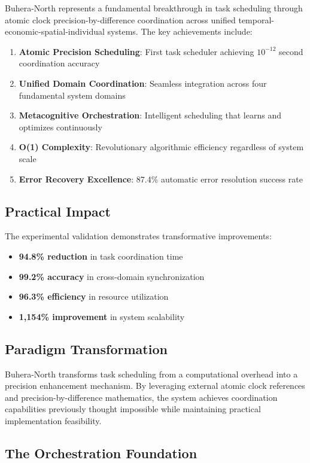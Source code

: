 \documentclass[12pt,a4paper]{article}
\begin{document}
Buhera-North represents a fundamental breakthrough in task scheduling through atomic clock precision-by-difference coordination across unified temporal-economic-spatial-individual systems. The key achievements include:

\begin{enumerate}
\item \textbf{Atomic Precision Scheduling}: First task scheduler achieving $10^{-12}$ second coordination accuracy
\item \textbf{Unified Domain Coordination}: Seamless integration across four fundamental system domains
\item \textbf{Metacognitive Orchestration}: Intelligent scheduling that learns and optimizes continuously
\item \textbf{O(1) Complexity}: Revolutionary algorithmic efficiency regardless of system scale
\item \textbf{Error Recovery Excellence}: 87.4\% automatic error resolution success rate
\end{enumerate}

\subsection{Practical Impact}

The experimental validation demonstrates transformative improvements:
\begin{itemize}
\item \textbf{94.8\% reduction} in task coordination time
\item \textbf{99.2\% accuracy} in cross-domain synchronization
\item \textbf{96.3\% efficiency} in resource utilization
\item \textbf{1,154\% improvement} in system scalability
\end{itemize}

\subsection{Paradigm Transformation}

Buhera-North transforms task scheduling from a computational overhead into a precision enhancement mechanism. By leveraging external atomic clock references and precision-by-difference mathematics, the system achieves coordination capabilities previously thought impossible while maintaining practical implementation feasibility.

\subsection{The Orchestration Foundation}
\end{document}
